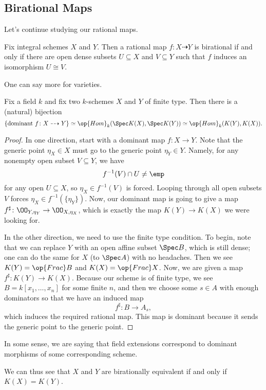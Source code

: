 \documentclass[../notes.tex]{subfiles}
\begin{document}
\subsection{Birational Maps}
Let's continue studying our rational maps.
\begin{proposition}
	Fix integral schemes $X$ and $Y$. Then a rational map $f\colon X\dashrightarrow Y$ is birational if and only if there are open dense subsets $U\subseteq X$ and $V\subseteq Y$ such that $f$ induces an isomorphism $U\cong V$.
\end{proposition}
One can say more for varieties.
\begin{proposition}
	Fix a field $k$ and fix two $k$-schemes $X$ and $Y$ of finite type. Then there is a (natural) bijection
	\[\{\text{dominant }f\colon X\dashrightarrow Y\}\simeq\op{Hom}_k(\Spec K(X),\Spec K(Y))\simeq\op{Hom}_k(K(Y),K(X)).\]
\end{proposition}
\begin{proof}
	In one direction, start with a dominant map $f\colon X\to Y$. Note that the generic point $\eta_X\in X$ must go to the generic point $\eta_Y\in Y$. Namely, for any nonempty open subset $V\subseteq Y$, we have
	\[f^{-1}(V)\cap U\ne\emp\]
	for any open $U\subseteq X$, so $\eta_X\in f^{-1}(V)$ is forced. Looping through all open subsets $V$ forces $\eta_X\in f^{-1}(\{\eta_Y\})$. Now, our dominant map is going to give a map $f^\sharp\colon\OO_{Y,\eta_Y}\to\OO_{X,\eta_X}$, which is exactly the map $K(Y)\to K(X)$ we were looking for.

	In the other direction, we need to use the finite type condition. To begin, note that we can replace $Y$ with an open affine subset $\Spec B$, which is still dense; one can do the same for $X$ (to $\Spec A$) with no headaches. Then we see $K(Y)=\op{Frac}B$ and $K(X)=\op{Frac}X$. Now, we are given a map $f^\sharp\colon K(Y)\to K(X)$. Because our scheme is of finite type, we see $B=k[x_1,\ldots,x_n]$ for some finite $n$, and then we choose some $s\in A$ with enough dominators so that we have an induced map
	\[f^\sharp\colon B\to A_s,\]
	which induces the required rational map. This map is dominant because it sends the generic point to the generic point.
\end{proof}
\begin{remark}
	In some sense, we are saying that field extensions correspond to dominant morphisms of some corresponding scheme.
\end{remark}
We can thus see that $X$ and $Y$ are birationally equivalent if and only if $K(X)=K(Y)$.
\end{document}
